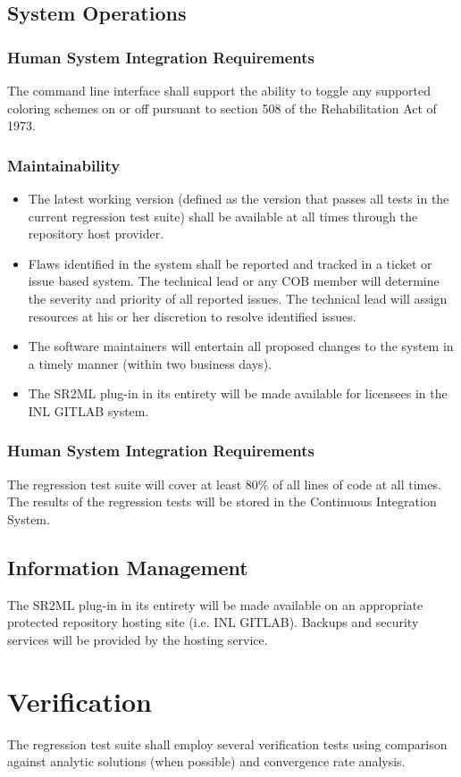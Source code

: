 \subsection{System Operations}
\subsubsection{Human System Integration Requirements}
The command line interface shall support the ability to toggle any supported coloring schemes on or off pursuant to section
508 of the Rehabilitation Act of 1973.
\subsubsection{Maintainability}
\begin{itemize}
  \item The latest working version (defined as the version that passes all tests in the current regression test suite) shall be
            available at all times through the repository host provider.
  \item  Flaws identified in the system shall be reported and tracked in a ticket or issue based system. The technical lead or
            any COB member will
            determine the severity and priority of all reported issues. The technical lead will assign resources at his or her
            discretion to resolve identified issues.
  \item  The software maintainers will entertain all proposed changes to the system in a timely manner
           (within two business days).
%
%
  \item  The SR2ML plug-in in its entirety will be made available for licensees in the INL GITLAB system.
\end{itemize}
\subsubsection{Human System Integration Requirements}
The regression test suite will cover at least 80\% of all lines of code at all times.
The results of the regression tests will be stored in the Continuous Integration System.

\subsection{Information Management}
%
%
The SR2ML plug-in in its entirety will be made available on an appropriate protected repository hosting site (i.e. INL GITLAB).
Backups and security services will be provided by the hosting service.

\section{Verification}
The regression test suite shall employ several verification tests using comparison against analytic
solutions (when possible) and convergence rate analysis.
